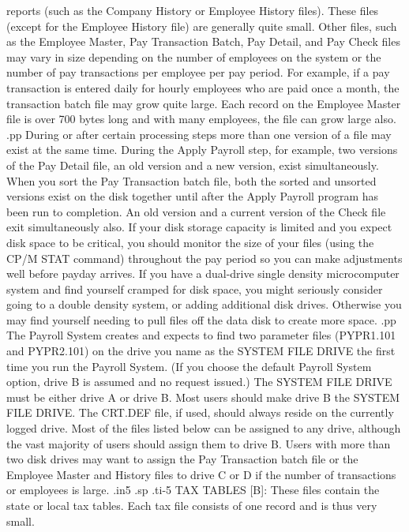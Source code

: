 reports (such as the Company History or Employee History files).  These
files (except for the Employee History file)
are generally quite small.  Other files, such as the Employee Master,
Pay Transaction Batch, Pay Detail, and Pay Check files may vary in size
depending on the number of employees on the system or the number of
pay transactions per employee per pay period.  For example, if a pay
transaction is entered daily for hourly employees who are paid once
a month, the transaction batch file may grow quite large.  Each
record on the Employee Master file is over 700 bytes long and with many
employees, the file can grow large also.
.pp
During or after certain
processing steps more than one version
of a file may exist at the same time.
During the Apply Payroll step, for example, two versions of the Pay
Detail file, an old version and a new version, exist simultaneously.
When you sort the Pay Transaction batch file, both the sorted and unsorted
versions exist on the disk together until after the Apply Payroll
program has been run to completion.  An old version and a current version
of the Check file exit simultaneously also.
If your disk storage capacity is
limited and you expect disk space to be critical, you should monitor
the size of your files (using the CP/M STAT command) throughout the pay
period so you can make adjustments well before payday arrives.	If you
have a dual-drive single density microcomputer system and find yourself
cramped for disk space, you might seriously consider going to a
double density system, or adding additional disk drives. Otherwise
you may find yourself needing to pull files off the data disk to create
more space.
.pp
The Payroll System creates and expects to find two parameter files
(PYPR1.101 and PYPR2.101)
on the drive you name as the SYSTEM FILE DRIVE the first time you run the
Payroll System.  (If you choose the default Payroll System option, drive B
is assumed and no request issued.)
The SYSTEM FILE DRIVE must be either drive A or drive B.
Most users should make drive B the SYSTEM FILE DRIVE.  The CRT.DEF file,
if used, should always reside on the currently logged drive.  Most of the files
listed below can be assigned to any drive, although the vast majority
of users should assign them to drive B.  Users with more than two
disk drives may want to assign the Pay Transaction batch file or the
Employee Master and History files
to drive C or D if the number of transactions or
employees is large.
.in5
.sp
.ti-5
TAX TABLES [B]: These files contain the state or local tax tables.  Each
tax file consists of one record and is thus very small.

